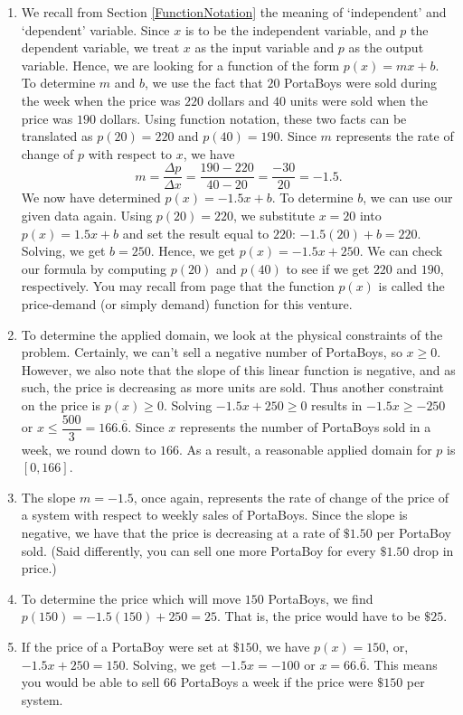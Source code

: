 {
\begin{enumerate}

\item  We recall from Section \ref{FunctionNotation} the meaning of `independent' and `dependent' variable.  Since $x$ is to be the independent variable, and $p$ the dependent variable, we treat $x$ as the input variable and $p$ as the output variable.  Hence, we are looking for a function of the form $p(x) = mx + b$.  To determine $m$ and $b$, we use the fact that $20$ PortaBoys were sold during the week when the price was $220$ dollars and $40$ units were sold when the price was $190$ dollars.  Using function notation, these two facts can be translated as $p(20)=220$ and $p(40)=190$.  Since $m$ represents the rate of change of $p$ with respect to $x$, we have  
\[
 m = \dfrac{\Delta p}{\Delta x} = \dfrac{190-220}{40-20} = \dfrac{-30}{20} = -1.5.
\]  
We now have determined $p(x) = -1.5 x + b$.  To determine $b$, we can use our given data again.  Using $p(20) = 220$, we substitute $x=20$ into $p(x) = 1.5x + b$ and set the result equal to $220$:  $-1.5(20)+b = 220$.  Solving, we get  $b = 250$. Hence, we get $p(x) = -1.5x + 250$.  We can check our formula by computing $p(20)$ and $p(40)$ to see if we get $220$ and $190$, respectively.  You may recall from page \pageref{pricerevenuecostprofit} that the function $p(x)$ is called the price-demand (or simply demand) function for this venture.

\item  To determine the applied domain, we look at the physical constraints of the problem.  Certainly, we can't sell a negative number of PortaBoys, so $x \geq 0$. However, we also note that the slope of this linear function is negative, and as such, the price is decreasing as more units are sold.  Thus another constraint on the price is $p(x)\geq 0$.  Solving $-1.5 x + 250 \geq 0$ results in $-1.5 x \geq -250$ or $x \leq \dfrac{500}{3} = 166.\overline{6}$.  Since $x$ represents the number of PortaBoys sold in a week, we round down to $166$.  As a result, a reasonable applied domain for $p$ is $[0,166]$.  

\item The slope $m = -1.5$, once again, represents the rate of change of the price of a system with respect to weekly sales of PortaBoys.  Since the slope is negative, we have that the price is decreasing at a rate of $\$1.50$ per PortaBoy sold.  (Said differently, you can sell one more PortaBoy for every $\$1.50$ drop in price.)

\item  To determine the price which will move $150$ PortaBoys, we find $p(150) = -1.5(150) + 250 = 25$.  That is, the price would have to be $\$25$.

\item  If the price of a PortaBoy were set at $\$150$, we have $p(x) = 150$, or, $-1.5x + 250 = 150$.  Solving, we get $-1.5x = -100$ or $x = 66.\overline{6}$. This means you would be able to sell $66$ PortaBoys a week if the price were $\$150$ per system.

\end{enumerate}
}


